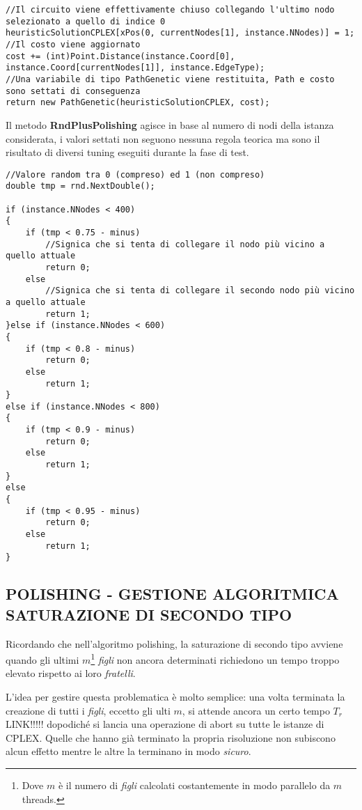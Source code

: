 \documentclass[11pt]{article}
\begin{document}
\begin{lstlisting}
//Il circuito viene effettivamente chiuso collegando l'ultimo nodo selezionato a quello di indice 0
heuristicSolutionCPLEX[xPos(0, currentNodes[1], instance.NNodes)] = 1;
//Il costo viene aggiornato
cost += (int)Point.Distance(instance.Coord[0], instance.Coord[currentNodes[1]], instance.EdgeType);
//Una variabile di tipo PathGenetic viene restituita, Path e costo sono settati di conseguenza
return new PathGenetic(heuristicSolutionCPLEX, cost);

\end{lstlisting}

Il metodo \textbf{RndPlusPolishing} agisce in base al numero di nodi della istanza considerata, i valori settati non seguono nessuna regola teorica ma sono il risultato di diversi tuning eseguiti durante la fase di test.

\begin{lstlisting}
//Valore random tra 0 (compreso) ed 1 (non compreso)
double tmp = rnd.NextDouble();

if (instance.NNodes < 400)
{
    if (tmp < 0.75 - minus)
        //Signica che si tenta di collegare il nodo più vicino a quello attuale
        return 0;
    else
        //Signica che si tenta di collegare il secondo nodo più vicino a quello attuale
        return 1;
}else if (instance.NNodes < 600)
{
    if (tmp < 0.8 - minus)
        return 0;
    else
        return 1;
}
else if (instance.NNodes < 800)
{
    if (tmp < 0.9 - minus)
        return 0;
    else
        return 1;
}
else
{
    if (tmp < 0.95 - minus)
        return 0;
    else
        return 1;
}

\end{lstlisting}

\subsection*{POLISHING - GESTIONE ALGORITMICA SATURAZIONE DI SECONDO TIPO}
\label{sec:PolishingSatDueS}

Ricordando che nell'algoritmo polishing, la saturazione di secondo tipo avviene quando gli ultimi $m$\footnote{Dove $m$ è il numero di \textit{figli} calcolati costantemente in modo parallelo da $m$ threads.} \textit{figli} non ancora determinati richiedono un tempo troppo elevato rispetto ai loro \textit{fratelli}.

L'idea per gestire questa problematica è molto semplice: una volta terminata la creazione di tutti i \textit{figli}, eccetto gli ulti $m$, si attende ancora un certo tempo $T_r$ LINK!!!!! dopodiché si lancia una operazione di abort su tutte le istanze di CPLEX. Quelle che hanno già terminato la propria risoluzione non subiscono alcun effetto mentre le altre la terminano in modo \textit{sicuro}.
\end{document}
